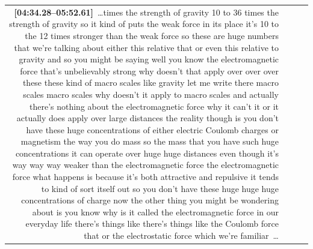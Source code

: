 \documentclass[10pt]{article}
\begin{document}
\begin{tiny}
\begin{longtable}{r p{0.3in} p{1.212in} p{3.8in}}
                                                                                                                                                                                                                                                                                                                                                                                                                                                                                   \textbf{[04:34.28--05:52.61]}~\ldots times the strength of gravity 10 to 36 times the strength of gravity so it kind of puts the weak force in its place it's 10 to the 12 times stronger than the weak force so these are huge numbers that we're talking about either this relative that or even this relative to gravity and so you might be saying well you know the electromagnetic force that's unbelievably strong why doesn't that apply over over over these these kind of macro scales like gravity let me write there macro scales macro scales why doesn't it apply to macro scales and actually there's nothing about the electromagnetic force why it can't it or it actually does apply over large distances the reality though is you don't have these huge concentrations of either electric Coulomb charges or magnetism the way you do mass so the mass that you have such huge concentrations it can operate over huge huge distances even though it's way way way weaker than the electromagnetic force the electromagnetic force what happens is because it's both attractive and repulsive it tends to kind of sort itself out so you don't have these huge huge huge concentrations of charge now the other thing you might be wondering about is you know why is it called the electromagnetic force in our everyday life there's things like there's things like the Coulomb force that or the electrostatic force which we're familiar~\ldots \\

\end{longtable}
\end{tiny}
\end{document}
